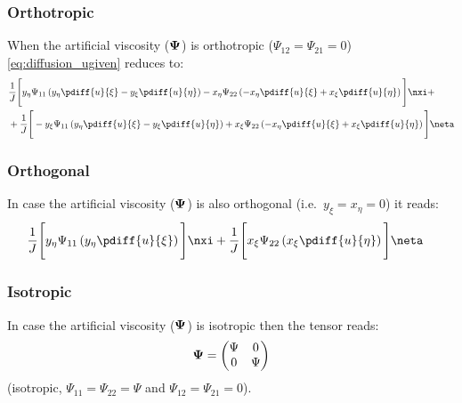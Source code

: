\subsubsection*{Orthotropic}
When the artificial viscosity ($\mbox{\boldmath ${\mathrm{\Psi}}$}$) is orthotropic  ($\Psi_{12} = \Psi_{21} = 0$) \autoref{eq:diffusion_ugiven} reduces to:
\begin{align}
    &
    \frac{1}{J} \Bigg[ y_\eta
    \Psi_{11} \left( y_\eta \pdiff{u}{\xi} - y_\xi  \pdiff{u}{\eta}\right)
    - x_\eta
    \Psi_{22} \left( - x_\eta \pdiff{u}{\xi} + x_\xi \pdiff{u}{\eta} \right)
    \Bigg] \nxi
    +
    \\
    & + \frac{1}{J} \Bigg[
    -y_\xi
    \Psi_{11} \left( y_\eta \pdiff{u}{\xi} - y_\xi  \pdiff{u}{\eta}\right)
    +   x_\xi
    \Psi_{22} \left( - x_\eta \pdiff{u}{\xi} + x_\xi \pdiff{u}{\eta} \right)
    \Bigg] \neta
\end{align}

\subsubsection*{Orthogonal}
In case the artificial viscosity ($\mbox{\boldmath ${\mathrm{\Psi}}$}$) is also orthogonal (i.e.\ $y_\xi = x_\eta =0$) it reads:
\begin{align}
    &
    \frac{1}{J} \Bigg[ y_\eta
    \Psi_{11} \left( y_\eta \pdiff{u}{\xi} \right)
    \Bigg] \nxi
    + \frac{1}{J} \Bigg[
    x_\xi
    \Psi_{22} \left( x_\xi \pdiff{u}{\eta} \right)
    \Bigg] \neta
\end{align}

\subsubsection*{Isotropic}
In case the artificial viscosity ($\mbox{\boldmath ${\mathrm{\Psi}}$}$) is isotropic then the tensor reads:
\begin{align}
    \boldsymbol{\Psi} =
    \begin{pmatrix}
        \Psi & 0 \\
        0 & \Psi
    \end{pmatrix}
\end{align}
 (isotropic, $\Psi_{11} = \Psi_{22} = \Psi$ and $\Psi_{12} = \Psi_{21} = 0$).

